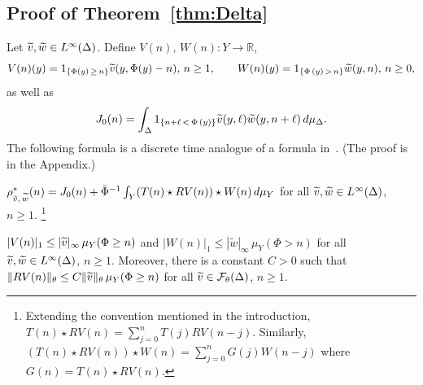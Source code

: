 \documentclass[AHL,Unicode,longabstracts,published]{cedram}
\newcommand{\R}{\mathbb{R}}
\newcommand{\cF}{\mathcal{F}}
\newcommand{\tw}{\widetilde{w}}
\newcommand{\tv}{\tilde{v}}
\let\oldtilde\tilde
\renewcommand*{\tilde}[1]{\mathchoice{\widetilde{#1}}{\widetilde{#1}}{\oldtilde{#1}}{\oldtilde{#1}}}
\begin{document}
\subsection{Proof of Theorem~\ref{thm:Delta}}\label{sec:X}



Let $\tv,\tw\in L^\infty(\Delta)$. Define $V(n),\,W(n):Y\to\R$,
\[
V(n)(y)=1_{\left\{\Phi(y)\,\ge\,n\right\}}\tv(y,\Phi(y)-n),\,n\ge1,
\qquad W(n)(y)= 1_{\left\{\Phi\,(y)\,>\,n\right\}}\tw(y,n), \, n\ge0,
\]
as well as
\[
J_0(n) =\int_\Delta 1_{\left\{n+\ell\,<\,\Phi\,(y)\right\}}\tv(y,\ell)\tw(y,n+\ell)\,d\mu_\Delta.
\]
The following formula is a discrete time analogue of a formula in~\cite{Pollicott85}. (The proof is in the Appendix.)

\begin{prop}\label{prop:conv}
$\rho^*_{\tv,\,\tw}(n)=J_0(n)+\bar\Phi^{-1}\int_Y (T(n)\star RV(n))\star W(n)\,d\mu_Y$ for all $\tv,\tw\in L^\infty(\Delta)$, $n\ge1$.
\footnote{Extending the convention mentioned in the introduction, $T(n)\star RV(n)=\sum_{j=0}^n T(j)RV(n-j)$. Similarly, $(T(n)\star RV(n))\star W(n)=\sum_{j=0}^n G(j)W(n-j)$ where $G(n)=T(n)\star RV(n)$.}
\end{prop}


\begin{prop}\label{prop:Vn}
$|V(n)|_1\le |\tv|_\infty\, \mu_Y(\Phi\ge n)$ and $|W(n)|_1\le |\tw|_\infty\, \mu_Y(\Phi>n)$ for all $\tv,\tw\in L^\infty(\Delta)$, $n\ge1$. Moreover, there is a constant $C>0$ such that $\|RV(n)\|_\theta\le C \|\tv\|_\theta\, \mu_Y(\Phi\ge n)$ for all $\tv\in\cF_\theta(\Delta)$, $n\ge1$.
\end{prop}
\end{document}
